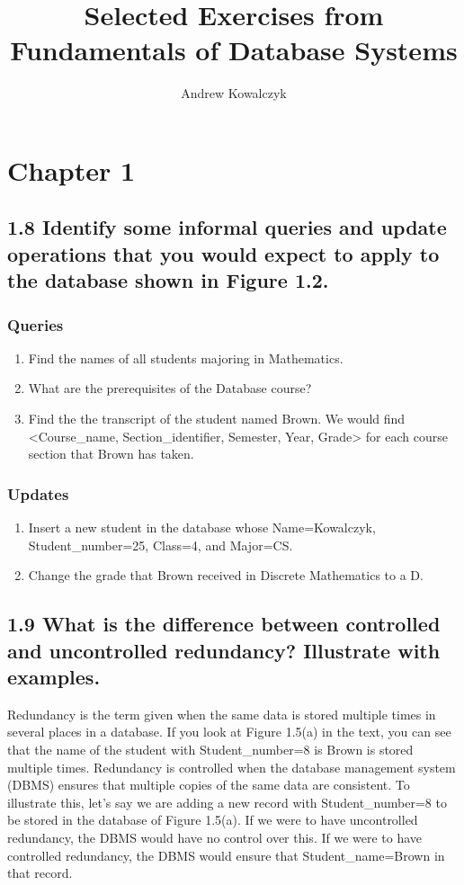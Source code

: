 \documentclass[11pt, oneside]{article}   	%
\title{Selected Exercises from Fundamentals of Database Systems}
\author{Andrew Kowalczyk}
\date{}
\begin{document}
\maketitle

\section*{Chapter 1}

\subsection*{1.8 Identify some informal queries and update operations that you would expect to apply to the database shown in Figure 1.2.}

\subsubsection*{Queries}

\begin{enumerate}
\item Find the names of all students majoring in Mathematics.
\item What are the prerequisites of the Database course?
\item Find the the transcript of the student named Brown. We would find <Course\_name, Section\_identifier, Semester, Year, Grade> for each course section that Brown has taken.
\end{enumerate}

\subsubsection*{Updates}

\begin{enumerate}
\item Insert a new student in the database whose Name=Kowalczyk, Student\_number=25, Class=4, and Major=CS.
\item Change the grade that Brown received in Discrete Mathematics to a D.
\end{enumerate}

\subsection*{1.9 What is the difference between controlled and uncontrolled redundancy? Illustrate with examples.}
Redundancy is the term given when the same data is stored multiple times in several places in a database. If you look at Figure 1.5(a)  in the text, you can see that the name of the student with Student\_number=8 is Brown is stored multiple times. Redundancy is controlled when the database management system (DBMS) ensures that multiple copies of the same data are consistent. To illustrate this, let's say we are adding a new record with Student\_number=8 to be stored in the database of Figure 1.5(a). If we were to have uncontrolled redundancy, the DBMS would have no control over this. If we were to have controlled redundancy, the DBMS would ensure that Student\_name=Brown in that record.
\end{document}
